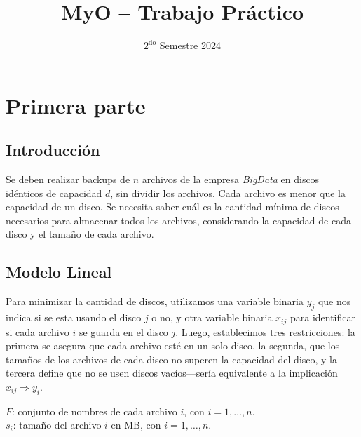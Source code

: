 \documentclass[11pt, a4paper, pdftex]{article}
\title{
	\huge MyO -- Trabajo Práctico\\
}
\author{
	\Mati \and \Xime \and \Lucifer \and \Lu
}
\date{\small $\text{2}^{\text{do}}$ Semestre 2024
}
\begin{document}
\renewcommand{\contentsname}{Contenidos}
\renewcommand{\listfigurename}{Listado de Figuras}
\renewcommand{\listtablename}{Listado de Tablas}
\renewcommand{\tablename}{Tabla}

\newcommand{\minimize}{\texttt{Minimize}\quad\,\,}
\newcommand{\maximize}{\texttt{Maximize}\quad\,\,}
\newcommand{\subjto}{\texttt{Subject to}\quad}

\maketitle

\tableofcontents

\newpage
\section{Primera parte}

\subsection{Introducción}

Se deben realizar backups de $n$ archivos de la empresa \emph{BigData}
en discos idénticos de capacidad $d$, sin dividir los archivos. Cada
archivo es menor que la capacidad de un disco. Se necesita saber cuál es
la cantidad mínima de discos necesarios para almacenar todos los
archivos, considerando la capacidad de cada disco y el tamaño de cada
archivo. 

\subsection{Modelo Lineal}

Para minimizar la cantidad de discos, utilizamos una variable binaria
$y_{j}$ que nos indica si se esta usando el disco $j$ o no, y otra
variable binaria $x_{ij}$ para identificar si cada archivo $i$ se guarda
en el disco $j$. Luego, establecimos tres restricciones: la primera se
asegura que cada archivo esté en un solo disco, la segunda, que los
tamaños de los archivos de cada disco no superen la capacidad del disco,
y la tercera define que no se usen discos vacíos---sería equivalente a
la implicación $x_{ij} \Rightarrow y_i$.

$F$: conjunto de nombres de cada archivo $i$, con $i = 1, \ldots, n$. \\

$s_{i}$: tamaño del archivo $i$ en MB, con $i = 1, \ldots, n$. \\
\end{document}
